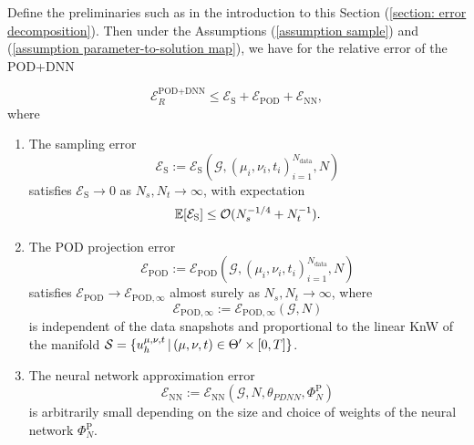 \begin{theorem} \label{theo: relative error POD+DNN}
    Define the preliminaries such as in the introduction to this Section (\ref{section: error decomposition}). 
    Then under the Assumptions (\ref{assumption sample}) and 
    (\ref{assumption parameter-to-solution map}), we have for the relative error of the POD+DNN
    
    \begin{equation*}
        \mathcal{E}_R^\text{POD+DNN} \leq \mathcal{E}_\text{S} + \mathcal{E}_{\text{POD}} + \mathcal{E}_{\text{NN}},
    \end{equation*}
    where 
    
    \begin{enumerate}
        \item The sampling error 
        \[
            \mathcal{E}_\text{S} := \mathcal{E}_\text{S}\left(\mathcal{G}, (\mu_i, \nu_i, t_i)_{i = 1}^{N_{\text{data}}}, N\right)
        \]
        satisfies $\mathcal{E}_\text{S} \to 0$ as $N_s, N_t \to \infty$, with expectation 
        \[
            \mathbb{E}[\mathcal{E}_\text{S}] \leq \mathcal{O}(N_s^{-1/4} + N_t^{-1}).
        \]
    
        \item The POD projection error 
        \[
            \mathcal{E}_{\text{POD}} := \mathcal{E}_{\text{POD}}
            \left(\mathcal{G}, (\mu_i, \nu_i, t_i)_{i = 1}^{N_{\text{data}}}, N\right)
        \]
        satisfies $\mathcal{E}_{\text{POD}} \to \mathcal{E}_{\text{POD}, \infty}$ almost surely as 
        $N_s, N_t \to \infty$, where
        \[
            \mathcal{E}_{\text{POD}, \infty} := \mathcal{E}_{\text{POD}, \infty}(\mathcal{G}, N)
        \]
        is independent of the data snapshots and proportional to the linear KnW of the manifold 
        $\mathcal{S} = \{ u_h^{\mu, \nu, t} \, \vert \, (\mu, \nu, t) \in \Theta' \times [0, T] \}$.
    
        \item The neural network approximation error
        \[
            \mathcal{E}_{\text{NN}} := \mathcal{E}_{\text{NN}}\left(\mathcal{G}, N, \theta_{PDNN}, \Phi_N^\text{P}\right)
        \]
        is arbitrarily small depending on the size and choice of weights of the neural network $\Phi^\text{P}_N$.
    \end{enumerate} 

\end{theorem}
